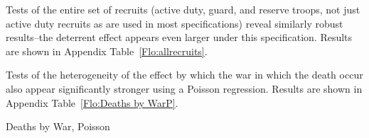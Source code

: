 \documentclass[12pt] {article}
\begin{document}
\begin{table}
\caption{}
\label{Flo:LNlinear90}
\scalebox{0.8}{
}
\end{table}


Tests of the entire set of recruits (active duty, guard, and reserve troops, not just active duty recruits as are used in most specifications) reveal similarly robust results--the deterrent effect appears even larger under this specification. Results are shown in Appendix Table~\ref{Flo:allrecruits}.

\begin{table}
\caption{}
\label{Flo:allrecruits}
\scalebox{0.8}{
}
\end{table}

Tests of the heterogeneity of the effect by which the war in which the death occur also appear significantly stronger using a Poisson regression. Results are shown in Appendix Table~\ref{Flo:Deaths by WarP}.

\begin{table}
\caption{Deaths by War, Poisson}
\label{Flo:Deaths by WarP}

\end{table}

\end{document}
